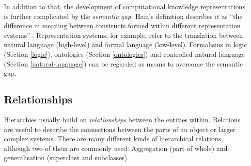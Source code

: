 In addition to that, the development of computational knowledge representations is further complicated by the \textit{semantic gap}.
Hein's definition describes it as \enquote{the difference in meaning between constructs formed within different representation systems} \cite{Hein2010a}.
Representation systems, for example, refer to the translation between natural language (high-level) and formal language (low-level).
Formalisms in logic (Section \ref{logic}), ontologies (Section \ref{ontologies}) and controlled natural language (Section \ref{natural-language}) can be regarded as means to overcome the semantic gap.

\subsection{Relationships} \label{relationships}
Hierarchies usually build on \textit{relationships} between the entities within.
Relations are useful to describe the connections between the parts of an object or larger complex systems.
There are many different kinds of hierarchical relations, although two of them are commonly used: Aggregation (part of whole) and generalisation (superclass and subclasses).


